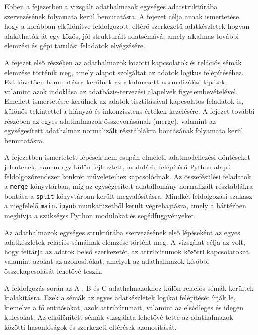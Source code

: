 
Ebben a fejezetben a vizsgált adathalmazok egységes adatstruktúrába szervezésének folyamata kerül bemutatásra. A fejezet célja annak ismertetése, hogy a korábban elkülönítve feldolgozott, eltérő szerkezetű adatkészletek hogyan alakíthatók át egy közös, jól strukturált adatsémává, amely alkalmas további elemzési és gépi tanulási feladatok elvégzésére.

A fejezet első részében az adathalmazok közötti kapcsolatok és relációs
sémák elemzése történik meg, amely alapot szolgáltat az adatok logikus
felépítéséhez. Ezt követően bemutatásra kerülnek az alkalmazott
normalizálási lépések, valamint azok indoklása az adatbázis-tervezési
alapelvek figyelembevételével. Emellett ismertetésre kerülnek az adatok
tisztításával kapcsolatos feladatok is, különös tekintettel a hiányzó és
inkonzisztens értékek kezelésére. A fejezet további részében az egyes
adathalmazok összevonásának (merge), valamint az egységesített adathalmaz
normalizált résztáblákra bontásának folyamata kerül bemutatásra.

A fejezetben ismertetett lépések nem csupán elméleti adatmodellezési
döntéseket jelentenek, hanem egy külön fejlesztett, moduláris felépítésű
Python-alapú feldolgozórendszer konkrét műveleteihez kapcsolódnak. Az
összefésülési feladatok a \texttt{merge} könyvtárban, míg az egységesített
adatállomány normalizált résztáblákra bontása a \texttt{split}
könyvtárban került megvalósításra. Mindkét feldolgozási szakasz a megfelelő
\texttt{main.ipynb} munkafüzetből került végrehajtásra, amely a háttérben
meghívja a szükséges Python modulokat és segédfüggvényeket.


Az adathalmazok egységes struktúrába szervezésének első lépéseként az egyes adatkészletek relációs sémáinak elemzése történt meg. A vizsgálat célja az volt, hogy feltárja az adatok belső szerkezetét, az attribútumok közötti kapcsolatokat, valamint azokat az azonosítókat, amelyek az adathalmazok későbbi összekapcsolását lehetővé teszik.

A feldolgozás során az A \cite{a}, B \cite{b} és C \cite{c} adathalmazokhoz külön relációs sémák kerültek kialakításra. Ezek a sémák az egyes adatkészletek logikai felépítését írják le, kiemelve a fő entitásokat, azok attribútumait, valamint az elsődleges és idegen kulcsokat. Az elkülönített sémák vizsgálata lehetővé tette az adathalmazok közötti hasonlóságok és szerkezeti eltérések azonosítását.

